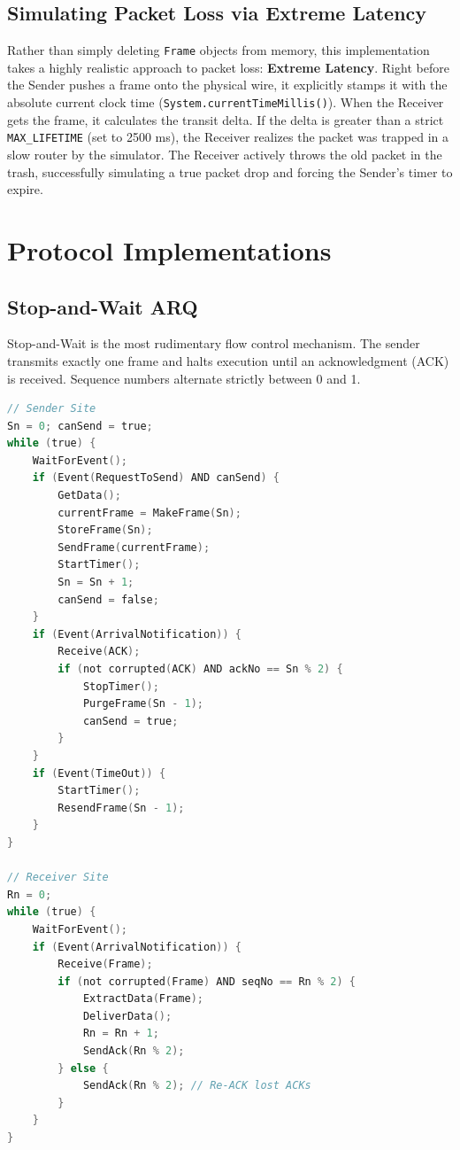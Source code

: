 \documentclass[12pt]{article}
\begin{document}
\subsection{Simulating Packet Loss via Extreme Latency}
Rather than simply deleting \texttt{Frame} objects from memory, this implementation takes a highly realistic approach to packet loss: \textbf{Extreme Latency}. Right before the Sender pushes a frame onto the physical wire, it explicitly stamps it with the absolute current clock time (\texttt{System.currentTimeMillis()}).
When the Receiver gets the frame, it calculates the transit delta. If the delta is greater than a strict \texttt{MAX\_LIFETIME} (set to 2500 ms), the Receiver realizes the packet was trapped in a slow router by the simulator. The Receiver actively throws the old packet in the trash, successfully simulating a true packet drop and forcing the Sender's timer to expire.

\section{Protocol Implementations}

\subsection{Stop-and-Wait ARQ}
Stop-and-Wait is the most rudimentary flow control mechanism. The sender transmits exactly one frame and halts execution until an acknowledgment (ACK) is received. Sequence numbers alternate strictly between 0 and 1. 

\begin{lstlisting}[language=C, caption=Stop-and-Wait ARQ (Forouzan Pseudo-code)]
// Sender Site
Sn = 0; canSend = true;
while (true) {
    WaitForEvent();
    if (Event(RequestToSend) AND canSend) {
        GetData();
        currentFrame = MakeFrame(Sn);
        StoreFrame(Sn);
        SendFrame(currentFrame);
        StartTimer();
        Sn = Sn + 1;
        canSend = false;
    }
    if (Event(ArrivalNotification)) {
        Receive(ACK);
        if (not corrupted(ACK) AND ackNo == Sn % 2) {
            StopTimer();
            PurgeFrame(Sn - 1);
            canSend = true;
        }
    }
    if (Event(TimeOut)) {
        StartTimer();
        ResendFrame(Sn - 1);
    }
}

// Receiver Site
Rn = 0;
while (true) {
    WaitForEvent();
    if (Event(ArrivalNotification)) {
        Receive(Frame);
        if (not corrupted(Frame) AND seqNo == Rn % 2) {
            ExtractData(Frame);
            DeliverData();
            Rn = Rn + 1;
            SendAck(Rn % 2);
        } else {
            SendAck(Rn % 2); // Re-ACK lost ACKs
        }
    }
}
\end{lstlisting}
\end{document}
